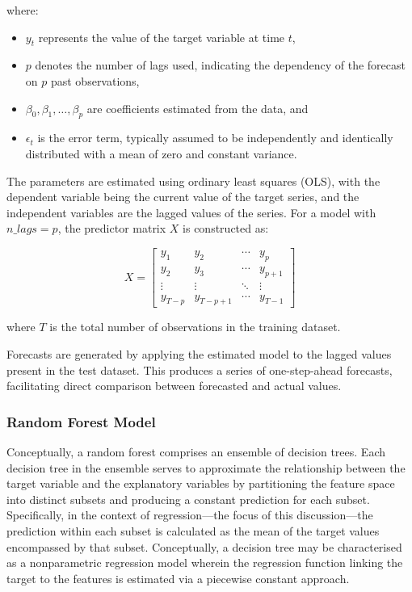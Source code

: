 where:
\begin{itemize}
    \item $y_t$ represents the value of the target variable at time $t$,
    \item $p$ denotes the number of lags used, indicating the dependency of the forecast on $p$ past observations,
    \item $\beta_0, \beta_1, \ldots, \beta_p$ are coefficients estimated from the data, and
    \item $\epsilon_t$ is the error term, typically assumed to be independently and identically distributed with a mean of zero and constant variance.
\end{itemize}

The parameters are estimated using ordinary least squares (OLS), with the dependent variable being the current value of the target series, and the independent variables are the lagged values of the series. For a model with $n\_lags = p$, the predictor matrix $X$ is constructed as:

\begin{equation}
    X = \begin{bmatrix}
    y_{1} & y_{2} & \cdots & y_{p} \\
    y_{2} & y_{3} & \cdots & y_{p+1} \\
    \vdots & \vdots & \ddots & \vdots \\
    y_{T-p} & y_{T-p+1} & \cdots & y_{T-1}
    \end{bmatrix}
\end{equation}

where $T$ is the total number of observations in the training dataset.

Forecasts are generated by applying the estimated model to the lagged values present in the test dataset. This produces a series of one-step-ahead forecasts, facilitating direct comparison between forecasted and actual values.


\subsubsection{Random Forest Model}

Conceptually, a random forest comprises an ensemble of decision trees. Each decision tree in the ensemble serves to approximate the relationship between the target variable and the explanatory variables by partitioning the feature space into distinct subsets and producing a constant prediction for each subset. Specifically, in the context of regression—the focus of this discussion—the prediction within each subset is calculated as the mean of the target values encompassed by that subset. Conceptually, a decision tree may be characterised as a nonparametric regression model wherein the regression function linking the target to the features is estimated via a piecewise constant approach.

